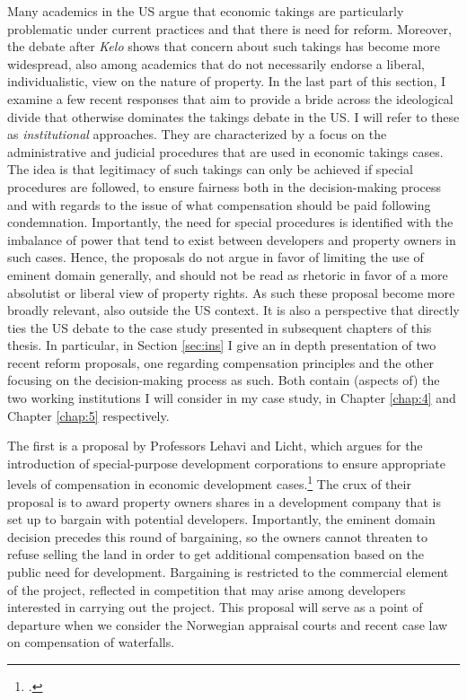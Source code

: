 Many academics in the US argue that economic takings are particularly problematic under current practices and that there is need for reform. Moreover, the debate after {\it Kelo} shows that concern about such takings has become more widespread, also among academics that do not necessarily endorse a liberal, individualistic, view on the nature of property. In the last part of this section, I examine a few recent responses that aim to provide a bride across the ideological divide that otherwise dominates the takings debate in the US. I will refer to these as {\it institutional} approaches. They are characterized by a focus on the administrative and judicial procedures that are used in economic takings cases. The idea is that legitimacy of such takings can only be achieved if special procedures are followed, to ensure fairness both in the decision-making process and with regards to the issue of what compensation should be paid following condemnation. Importantly, the need for special procedures is identified with the imbalance of power that tend to exist between developers and property owners in such cases. Hence, the proposals do not argue in favor of limiting the use of eminent domain generally, and should not be read as rhetoric in favor of a more absolutist or liberal view of property rights. As such these proposal become more broadly relevant, also outside the US context. It is also a perspective that directly ties the US debate to the case study presented in subsequent chapters of this thesis. In particular, in Section \ref{sec:ins} I give an in depth presentation of two recent reform proposals, one regarding compensation principles and the other focusing on the decision-making process as such. Both contain (aspects of) the two working institutions I will consider in my case study, in Chapter \ref{chap:4} and Chapter \ref{chap:5} respectively.

The first is a proposal by Professors Lehavi and Licht, which argues for the introduction of special-purpose development corporations to ensure appropriate levels of compensation in economic development cases.\footcite{lehavi07} The crux of their proposal is to award property owners shares in a development company that is set up to bargain with potential developers. Importantly, the eminent domain decision precedes this round of bargaining, so the owners cannot threaten to refuse selling the land in order to get additional compensation based on the public need for development. Bargaining is restricted to the commercial element of the project, reflected in competition that may arise among developers interested in carrying out the project. This proposal will serve as a point of departure when we consider the Norwegian appraisal courts and recent case law on compensation of waterfalls.

